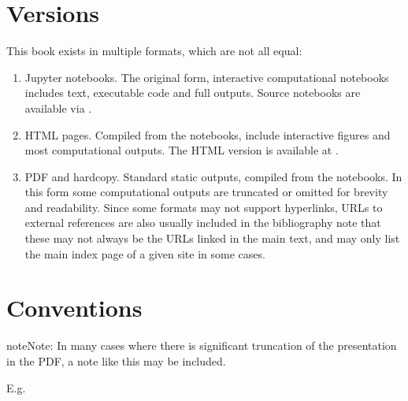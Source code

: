\documentclass[letterpaper,table,10pt,english]{jupyterBook}
\begin{document}
\section{Versions}
\label{\detokenize{frontmatter/book_versions_note:versions}}
\sphinxAtStartPar
This book exists in multiple formats, which are not all equal:
\begin{enumerate}
%
\item {} 
\sphinxAtStartPar
Jupyter notebooks. The original form, interactive computational notebooks includes text, executable code and full outputs. Source notebooks are available via .

\item {} 
\sphinxAtStartPar
HTML pages. Compiled from the notebooks, include interactive figures and most computational outputs. The HTML version is available at .

\item {} 
\sphinxAtStartPar
PDF and hard\sphinxhyphen{}copy. Standard static outputs, compiled from the notebooks. In this form some computational outputs are truncated or omitted for brevity and readability. Since some formats may not support hyperlinks, URLs to external references are also usually included in the bibliography \sphinxhyphen{} note that these may not always be the  URLs linked in the main text, and may only list the main index page of a given site in some cases.

\end{enumerate}


\section{Conventions}
\label{\detokenize{frontmatter/book_versions_note:conventions}}
\begin{sphinxShadowBox}
\sphinxstylesidebartitle{}

\begin{sphinxadmonition}{note}{Note:}
\sphinxAtStartPar
In many cases where there is significant truncation of the presentation in the PDF, a note like this may be included.

\sphinxAtStartPar
E.g. 
\end{sphinxadmonition}
\end{sphinxShadowBox}
\end{document}
